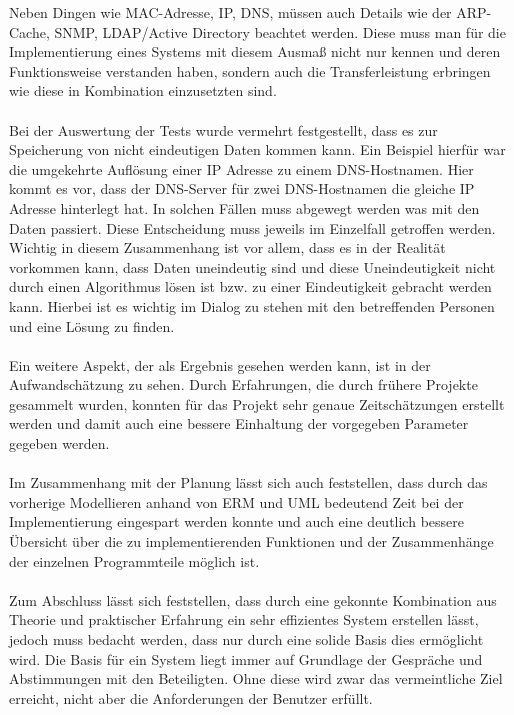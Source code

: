 Neben Dingen wie MAC-Adresse, IP, DNS, müssen auch Details wie der ARP-Cache, SNMP, LDAP/Active Directory beachtet werden.
Diese muss man für die Implementierung eines Systems mit diesem Ausmaß nicht nur kennen und deren Funktionsweise verstanden haben, sondern auch die Transferleistung erbringen wie diese in Kombination einzusetzten sind.\\\\
Bei der Auswertung der Tests wurde vermehrt festgestellt, dass es zur Speicherung von nicht eindeutigen Daten kommen kann.
Ein Beispiel hierfür war die umgekehrte Auflösung einer IP Adresse zu einem DNS-Hostnamen.
Hier kommt es vor, dass der DNS-Server für zwei DNS-Hostnamen die gleiche IP Adresse hinterlegt hat.
In solchen Fällen muss abgewegt werden was mit den Daten passiert. Diese Entscheidung muss jeweils im Einzelfall getroffen werden.
Wichtig in diesem Zusammenhang ist vor allem, dass es in der Realität vorkommen kann, dass Daten uneindeutig sind und diese Uneindeutigkeit nicht durch einen Algorithmus lösen ist bzw. zu einer Eindeutigkeit gebracht werden kann.
Hierbei ist es wichtig im Dialog zu stehen mit den betreffenden Personen und eine Lösung zu finden.\\\\
Ein weitere Aspekt, der als Ergebnis gesehen werden kann, ist in der Aufwandschätzung zu sehen.
Durch Erfahrungen, die durch frühere Projekte gesammelt wurden, konnten für das Projekt sehr genaue Zeitschätzungen erstellt werden und damit auch eine bessere Einhaltung der vorgegeben Parameter gegeben werden.\\\\
Im Zusammenhang mit der Planung lässt sich auch feststellen, dass durch das vorherige Modellieren anhand von ERM und UML bedeutend Zeit bei der Implementierung eingespart werden konnte und auch eine deutlich bessere Übersicht über die zu implementierenden Funktionen und der Zusammenhänge der einzelnen Programmteile möglich ist.\\\\
Zum Abschluss lässt sich feststellen, dass durch eine gekonnte Kombination aus Theorie und praktischer Erfahrung ein sehr effizientes System erstellen lässt, jedoch muss bedacht werden, dass nur durch eine solide Basis dies ermöglicht wird.
Die Basis für ein System liegt immer auf Grundlage der Gespräche und Abstimmungen mit den Beteiligten. Ohne diese wird zwar das vermeintliche Ziel erreicht, nicht aber die Anforderungen der Benutzer erfüllt.